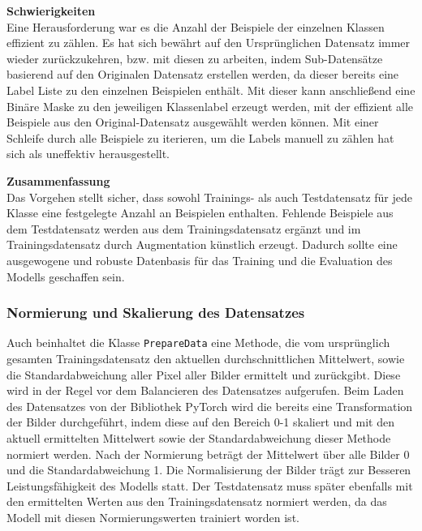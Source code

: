 \documentclass[12pt,oneside]{article}
\begin{document}
			
			

			

			

			\textbf{Schwierigkeiten} \\
			Eine Herausforderung war es die Anzahl der Beispiele der einzelnen Klassen effizient zu zählen. Es hat sich bewährt auf den Ursprünglichen Datensatz immer wieder zurückzukehren, bzw. mit diesen zu arbeiten, indem Sub-Datensätze basierend auf den Originalen Datensatz erstellen werden, da dieser bereits eine Label Liste zu den einzelnen Beispielen enthält. Mit dieser kann anschließend eine Binäre Maske zu den jeweiligen Klassenlabel erzeugt werden, mit der effizient alle Beispiele aus den Original-Datensatz ausgewählt werden können. Mit einer Schleife durch alle Beispiele zu iterieren, um die Labels manuell zu zählen hat sich als uneffektiv herausgestellt.

			\textbf{Zusammenfassung} \\
			Das Vorgehen stellt sicher, dass sowohl Trainings- als auch Testdatensatz für jede Klasse eine festgelegte Anzahl an Beispielen enthalten. Fehlende Beispiele aus dem Testdatensatz werden aus dem Trainingsdatensatz ergänzt und im Trainingsdatensatz durch Augmentation künstlich erzeugt. Dadurch sollte eine ausgewogene und robuste Datenbasis für das Training und die Evaluation des Modells geschaffen sein.

		\subsubsection{Normierung und Skalierung des Datensatzes}
			Auch beinhaltet die Klasse \texttt{PrepareData} eine Methode, die vom ursprünglich gesamten Trainingsdatensatz den aktuellen durchschnittlichen Mittelwert, sowie die Standardabweichung aller Pixel aller Bilder ermittelt und zurückgibt. Diese wird in der Regel vor dem Balancieren des Datensatzes aufgerufen. Beim Laden des Datensatzes von der Bibliothek PyTorch wird die bereits eine Transformation der Bilder durchgeführt, indem diese auf den Bereich 0-1 skaliert und mit den aktuell ermittelten Mittelwert sowie der Standardabweichung dieser Methode normiert werden. Nach der Normierung beträgt der Mittelwert über alle Bilder 0 und die Standardabweichung 1. Die Normalisierung der Bilder trägt zur Besseren Leistungsfähigkeit des Modells statt. Der Testdatensatz muss später ebenfalls mit den ermittelten Werten aus den Trainingsdatensatz normiert werden, da das Modell mit diesen Normierungswerten trainiert worden ist.
			
\end{document}
